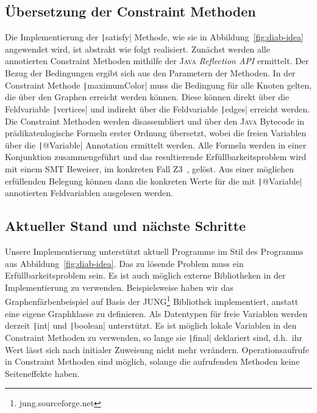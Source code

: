 \documentclass[a4paper,fontsize=12pt,headings=small,captions=tableheading,%
numbers=endperiod,abstracton,pdftex]{scrartcl}
\begin{document}
\subsection{Übersetzung der Constraint Methoden}
Die Implementierung der \texttt|satisfy| Methode, wie sie in
Abbildung~\ref{fig:diab-idea} angewendet wird, ist abstrakt wie folgt
realisiert.  Zunächst werden alle annotierten Constraint Methoden mithilfe der
\textsc{Java} \emph{Reflection API} ermittelt.  Der Bezug der Bedingungen ergibt
sich aus den Parametern der Methoden.  In der Constraint Methode
\texttt|maximumColor| muss die Bedingung für alle Knoten gelten, die
über den Graphen erreicht werden können.  Diese können direkt über die
Feldvariable \texttt|vertices| und indirekt über die Feldvariable
\texttt|edges| erreicht werden.  Die Constraint Methoden werden
disassembliert und über den \textsc{Java} Bytecode in prädikatenlogische Formeln
erster Ordnung übersetzt, wobei die freien Variablen über die
\texttt|@Variable| Annotation ermittelt werden.  Alle Formeln werden
in einer Konjunktion zusammengeführt und das resultierende Erfüllbarkeitsproblem
wird mit einem SMT Beweiser, im konkreten Fall Z3~\cite{MB:08}, gelöst.  Aus
einer möglichen erfüllenden Belegung können dann die konkreten Werte für die mit
\texttt|@Variable| annotierten Feldvariablen ausgelesen werden.

\subsection{Aktueller Stand und nächste Schritte}
Unsere Implementierung unterstützt aktuell Programme im Stil des Programms aus
Abbildung~\ref{fig:diab-idea}.  Das zu lösende Problem muss ein
Erfüllbarkeitsproblem sein.  Es ist auch möglich externe Bibliotheken in der
Implementierung zu verwenden.  Beispielsweise haben wir das
Graphenfärbenbeispiel auf Basis der JUNG\footnote{jung.sourceforge.net}
Bibliothek implementiert, anstatt eine eigene Graphklasse zu definieren.  Als
Datentypen für freie Variablen werden derzeit \texttt|int| und
\texttt|boolean| unterstützt.  Es ist möglich lokale Variablen in den
Constraint Methoden zu verwenden, so lange sie \texttt|final|
deklariert sind, d.h.~ihr Wert lässt sich nach initialer Zuweisung nicht mehr
verändern.  Operationsaufrufe in Constraint Methoden sind möglich, solange die
aufrufenden Methoden keine Seiteneffekte haben.
\end{document}
